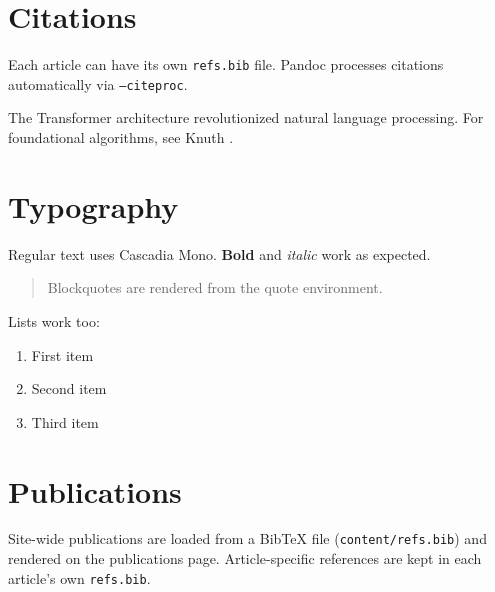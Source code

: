 \section{Citations}

Each article can have its own \texttt{refs.bib} file. Pandoc processes citations automatically via \texttt{--citeproc}.

The Transformer architecture \cite{vaswani2017attention} revolutionized natural language processing. For foundational algorithms, see Knuth \cite{knuth1997art}.

\section{Typography}

Regular text uses Cascadia Mono. \textbf{Bold} and \emph{italic} work as expected.

\begin{quote}
Blockquotes are rendered from the quote environment.
\end{quote}

Lists work too:

\begin{enumerate}
\item First item
\item Second item
\item Third item
\end{enumerate}

\section{Publications}

Site-wide publications are loaded from a BibTeX file (\texttt{content/refs.bib}) and rendered on the publications page. Article-specific references are kept in each article's own \texttt{refs.bib}.



